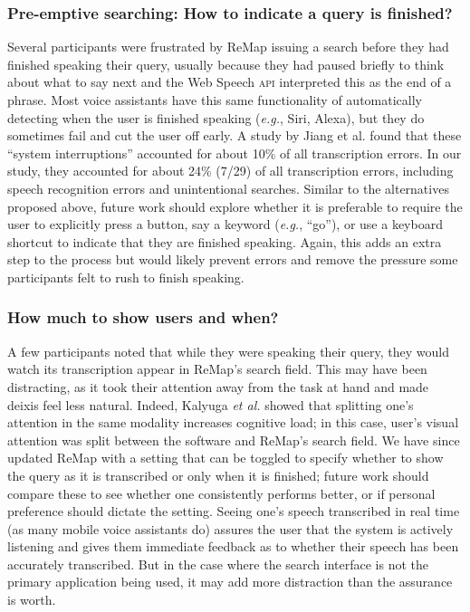 \subsubsection{Pre-emptive searching: How to indicate a query is finished?}
Several participants were frustrated by ReMap issuing a search before they had finished speaking their query, usually because they had paused briefly to think about what to say next and the Web Speech \textsc{api} interpreted this as the end of a phrase. Most voice assistants have this same functionality of automatically detecting when the user is finished speaking (\textit{e.g.}, Siri, Alexa), but they do sometimes fail and cut the user off early. A study by Jiang et al. \cite{Jiang2013} found that these ``system interruptions'' accounted for about 10\% of all transcription errors. In our study, they accounted for about 24\% (7/29) of all transcription errors, including speech recognition errors and unintentional searches. Similar to the alternatives proposed above, future work should explore whether it is preferable to require the user to explicitly press a button, say a keyword (\textit{e.g.}, ``go''), or use a keyboard shortcut to indicate that they are finished speaking. Again, this adds an extra step to the process but would likely prevent errors and remove the pressure some participants felt to rush to finish speaking.

\subsubsection{How much to show users and when?}
A few participants noted that while they were speaking their query, they would watch its transcription appear in ReMap's search field. This may have been distracting, as it took their attention away from the task at hand and made deixis feel less natural. Indeed, Kalyuga \textit{et al.} \cite{Kalyuga1999} showed that splitting one's attention in the same modality increases cognitive load; in this case, user's visual attention was split between the software and ReMap's search field. We have since updated ReMap with a setting that can be toggled to specify whether to show the query as it is transcribed or only when it is finished; future work should compare these to see whether one consistently performs better, or if personal preference should dictate the setting. Seeing one's speech transcribed in real time (as many mobile voice assistants do) assures the user that the system is actively listening and gives them immediate feedback as to whether their speech has been accurately transcribed. But in the case where the search interface is not the primary application being used, it may add more distraction than the assurance is worth. 

